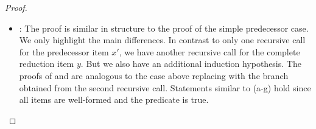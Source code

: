 \begin{isabellebody}
\begin{isamarkuptext}
\begin{proof}
\begin{itemize}
    (1) by definition.
    (2) by (). 
    (3) by (g) and the definition of .
    (4) by (e).
    (5) by (f,g).

  \item {}:
    The proof is similar in structure to the proof of the simple predecessor case. We only highlight
    the main differences. In contrast to only one recursive call for the predecessor item $x'$, we
    have another recursive call for the complete reduction item $y$. But we also have an additional
    induction hypothesis. The proofs of  and 
    are analogous to the case above replacing  with the branch obtained from
    the second recursive call. Statements similar to (a-g) hold since all items are well-formed and
    the predicate  is true.

\end{itemize}


\end{proof}
\end{isamarkuptext}
\end{isabellebody}
